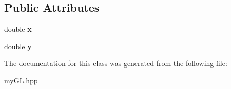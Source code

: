 \subsection*{Public Attributes}
\begin{DoxyCompactItemize}
\item 
\hypertarget{classCursorMovement_ac77861debf3dc2013b7ee0f6775b6540}{}double {\bfseries x}\label{classCursorMovement_ac77861debf3dc2013b7ee0f6775b6540}

\item 
\hypertarget{classCursorMovement_afab93e8fcc9f845fdcf6fffdf9232cab}{}double {\bfseries y}\label{classCursorMovement_afab93e8fcc9f845fdcf6fffdf9232cab}

\end{DoxyCompactItemize}


The documentation for this class was generated from the following file\+:\begin{DoxyCompactItemize}
\item 
my\+G\+L.\+hpp\end{DoxyCompactItemize}
